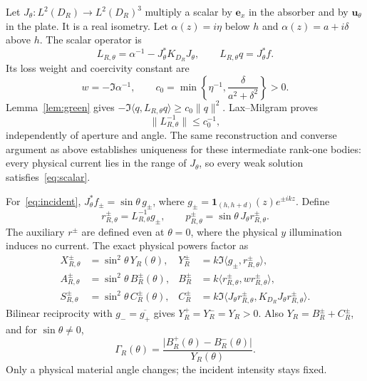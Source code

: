 \documentclass[11pt]{article}
\newcommand{\ex}{\mathbf e_x}
\newcommand{\uvec}{\mathbf u_\theta}
\newcommand{\ip}[2]{\langle #1,#2\rangle}
\newcommand{\norm}[1]{\lVert #1\rVert}
\newcommand{\abs}[1]{\lvert #1\rvert}
\begin{document}
Let $J_\theta:L^2(D_R)\to L^2(D_R)^3$ multiply a scalar by $\ex$ in the absorber and by $\uvec$ in the plate. It is a real isometry. Let $\alpha(z)=i\eta$ below $h$ and $\alpha(z)=a+i\delta$ above $h$. The scalar operator is
\begin{equation}\label{eq:scalar}
 L_{R,\theta}=\alpha^{-1}-J_\theta^*K_{D_R}J_\theta,\qquad
 L_{R,\theta}q=J_\theta^*f.
\end{equation}
Its loss weight and coercivity constant are
\begin{equation}\label{eq:c0}
 w=-\Im\alpha^{-1},\qquad
 c_0=\min\left\{\eta^{-1},\frac{\delta}{a^2+\delta^2}\right\}>0.
\end{equation}
Lemma~\ref{lem:green} gives $-\Im\ip{q}{L_{R,\theta}q}\geq c_0\norm{q}^2$. Lax--Milgram proves
\begin{equation}\label{eq:scalar-inverse}
 \norm{L_{R,\theta}^{-1}}\leq c_0^{-1},
\end{equation}
independently of aperture and angle. The same reconstruction and converse argument as above establishes uniqueness for these intermediate rank-one bodies: every physical current lies in the range of $J_\theta$, so every weak solution satisfies~\eqref{eq:scalar}.

For~\eqref{eq:incident}, $J_\theta^*f_\pm=\sin\theta\,g_\pm$, where $g_\pm=\mathbf1_{(h,h+d)}(z)e^{\pm ikz}$. Define
\begin{equation}\label{eq:normalized}
 r_{R,\theta}^\pm=L_{R,\theta}^{-1}g_\pm,\qquad
 p_{R,\theta}^\pm=\sin\theta\,J_\theta r_{R,\theta}^\pm.
\end{equation}
The auxiliary $r^\pm$ are defined even at $\theta=0$, where the physical $y$ illumination induces no current. The exact physical powers factor as
\begin{equation}\label{eq:factorization}
 \begin{aligned}
 X_{R,\theta}^\pm&=\sin^2\theta\,Y_R(\theta),
 &Y_R^\pm&=k\Im\ip{g_\pm}{r_{R,\theta}^\pm},\\
 A_{R,\theta}^\pm&=\sin^2\theta\,B_R^\pm(\theta),
 &B_R^\pm&=k\ip{r_{R,\theta}^\pm}{wr_{R,\theta}^\pm},\\
 S_{R,\theta}^\pm&=\sin^2\theta\,C_R^\pm(\theta),
 &C_R^\pm&=k\Im\ip{J_\theta r_{R,\theta}^\pm}{K_{D_R}J_\theta r_{R,\theta}^\pm}.
 \end{aligned}
\end{equation}
Bilinear reciprocity with $g_-=\overline{g_+}$ gives $Y_R^+=Y_R^-=Y_R>0$. Also $Y_R=B_R^\pm+C_R^\pm$, and for $\sin\theta\ne0$,
\begin{equation}\label{eq:aux-ratio}
 \Gamma_R(\theta)=\frac{\abs{B_R^+(\theta)-B_R^-(\theta)}}{Y_R(\theta)}.
\end{equation}
Only a physical material angle changes; the incident intensity stays fixed.
\end{document}
